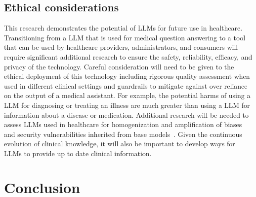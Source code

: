 \documentclass[10pt, letter, onecolumn]{arxiv}
\begin{document}
\begin{refsection}
\subsection{Ethical considerations}

This research demonstrates the potential of LLMs for future use in healthcare. Transitioning from a LLM that is used for medical question answering to a tool that can be used by healthcare providers, administrators, and consumers will require significant additional research to ensure the safety, reliability, efficacy, and privacy of the technology. Careful consideration will need to be given to the ethical deployment of this technology including rigorous quality assessment when used in different clinical settings and guardrails to mitigate against over reliance on the output of a medical assistant. For example, the potential harms of using a LLM for diagnosing or treating an illness are much greater than using a LLM for information about a disease or medication. Additional research will be needed to assess LLMs used in healthcare for homogenization and amplification of biases and security vulnerabilities inherited from base models~\cite{liang2022holistic,creel2022algorithmic,bommasani2021opportunities, kleinberg2021algorithmic, Bommasani2022Language}. Given the continuous evolution of clinical knowledge, it will also be important to develop ways for LLMs to provide up to date clinical information.






















































\section{Conclusion}
\label{sec:conclusion}


\end{refsection}
\end{document}
